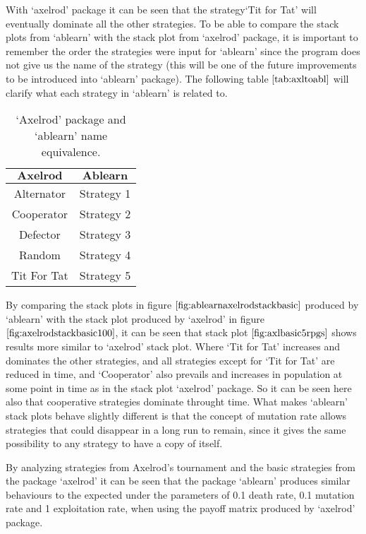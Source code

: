 With `axelrod' package it can be seen that the strategy`Tit for Tat' will eventually dominate all the other strategies. To be able to compare the stack plots from `ablearn' with the stack plot from `axelrod' package, it is important to remember the order the strategies were input for `ablearn' since the program does not give us the name of the strategy (this will be one of the future improvements to be introduced into `ablearn' package). The following table $\ref{tab:axltoabl}$ will clarify what each strategy in `ablearn' is related to.

\begin{table}[H]
\begin{center}
\begin{tabular}{|c|c|}
\hline
$\textbf{Axelrod}$& $\textbf{Ablearn}$\\ 
\hline
Alternator & Strategy 1\\
\hline
Cooperator & Strategy 2 \\
\hline
Defector & Strategy 3\\
\hline
Random & Strategy 4\\
\hline
Tit For Tat & Strategy 5\\
\hline
\end{tabular}
\end{center}
\caption{`Axelrod' package and `ablearn' name equivalence.}
\label{tab:axltoabl}
\end{table}

By comparing the stack plots in figure $\ref{fig:ablearnaxelrodstackbasic}$ produced by `ablearn' with the stack plot produced by `axelrod' in figure $\ref{fig:axelrodstackbasic100}$, it can be seen that stack plot $\ref{fig:axlbasic5rpgs}$ shows results more similar to `axelrod' stack plot. Where `Tit for Tat' increases and dominates the other strategies, and all strategies except for `Tit for Tat' are reduced in time, and `Cooperator' also prevails and increases in population at some point in time as in the stack plot `axelrod' package. So it can be seen here also that cooperative strategies dominate throught time.  What makes `ablearn' stack plots behave slightly different is that the concept of mutation rate allows strategies that could disappear in a long run to remain, since it gives the same possibility to any strategy to have a copy of itself. 

By analyzing strategies from Axelrod's tournament and the basic strategies from the package `axelrod' it can be seen that the package `ablearn' produces similar behaviours to the expected  under the parameters of 0.1 death rate, 0.1 mutation rate and 1 exploitation rate, when using the payoff matrix produced by `axelrod' package.
